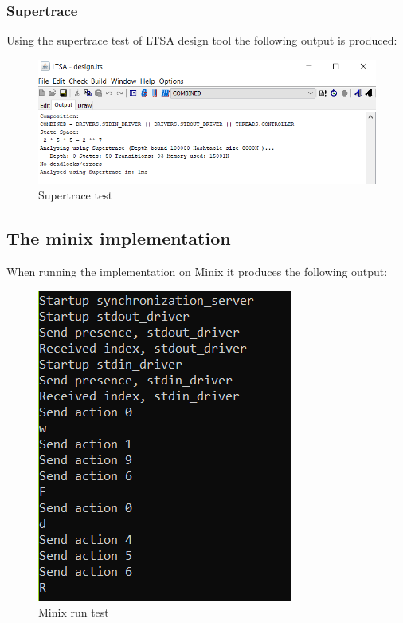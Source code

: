 \hypertarget{supertrace}{%
\subsubsection{Supertrace}\label{supertrace}}

Using the supertrace test of LTSA design tool the following output is
produced:

\begin{figure}
\centering
\includegraphics{../img/supertrace.png}
\caption{Supertrace test}
\end{figure}

\hypertarget{the-minix-implementation}{%
\subsection{The minix implementation}\label{the-minix-implementation}}

When running the implementation on Minix it produces the following
output:

\begin{figure}
\centering
\includegraphics{../img/output.png}
\caption{Minix run test}
\end{figure}

